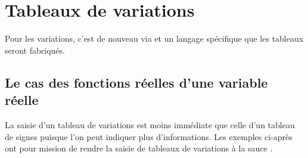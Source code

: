 \documentclass[10pt, a4paper]{article}
\begin{document}
\section{Tableaux de variations}

\begin{tdocnote}
	Pour les variations, c'est de nouveau via  et un langage spécifique que les tableaux seront fabriqués.
\end{tdocnote}




\subsection{Le cas des fonctions réelles d'une variable réelle}

La saisie d'un tableau de variations est moins immédiate que celle d'un tableau de signes puisque l'on peut indiquer plus d'informations. Les exemples ci-après ont pour mission de rendre  la saisie de tableaux de variations à la sauce \thispack.
\end{document}
